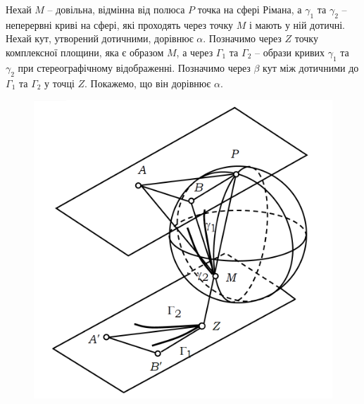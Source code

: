 \begin{solution}
    Нехай $M$ -- довільна, відмінна від полюса $P$ точка на сфері Рімана, а $\gamma_1$ та $\gamma_2$ -- неперервні криві на сфері, які проходять через точку $M$ і мають у ній дотичні. Нехай кут, утворений дотичними, дорівнює $\alpha$. Позначимо через $Z$ точку комплексної площини, яка є образом $M$, а через $\Gamma_1$ та $\Gamma_2$ -- образи кривих $\gamma_1$ та $\gamma_2$ при стереографічному відображенні. Позначимо через $\beta$ кут між дотичними до $\Gamma_1$ та $\Gamma_2$ у точці $Z$. Покажемо, що він дорівнює $\alpha$.\\
    
    \begin{figure}[H]
        \centering
        \includegraphics[scale=.321]{55.png}
    \end{figure}
    
    
    

\end{solution}
